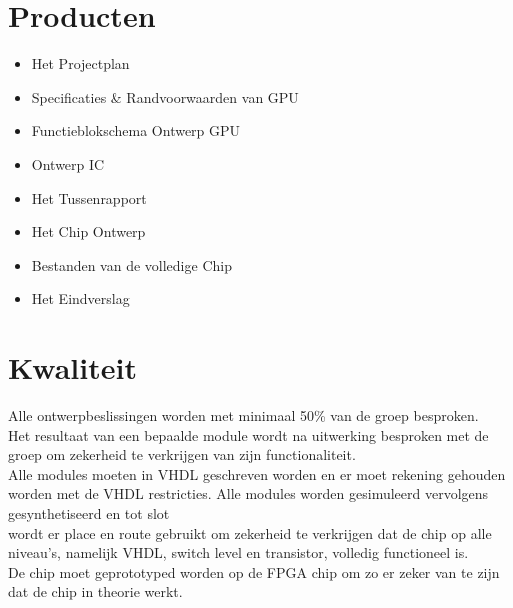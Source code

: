\documentclass{scrartcl}
\begin{document}
\section{Producten}
\begin{itemize}
\item Het Projectplan
\item Specificaties \& Randvoorwaarden van GPU
\item Functieblokschema Ontwerp GPU
\item Ontwerp IC
\item Het Tussenrapport
\item Het Chip Ontwerp
\item Bestanden van de volledige Chip
\item Het Eindverslag
\end {itemize}

\section{Kwaliteit}
Alle ontwerpbeslissingen worden met minimaal 50\% van de groep besproken.
\\Het resultaat van een bepaalde module wordt na uitwerking besproken met de groep om zekerheid te verkrijgen van zijn functionaliteit.
\\Alle modules moeten in VHDL geschreven worden en er moet rekening gehouden worden met de VHDL restricties. Alle modules worden gesimuleerd vervolgens gesynthetiseerd en tot slot \\wordt er place en route gebruikt om zekerheid te verkrijgen dat de chip op alle niveau's, namelijk VHDL, switch level en transistor, volledig functioneel is.
\\De chip moet geprototyped worden op de FPGA chip om zo er zeker van te zijn dat de chip in theorie werkt.
\end{document}
